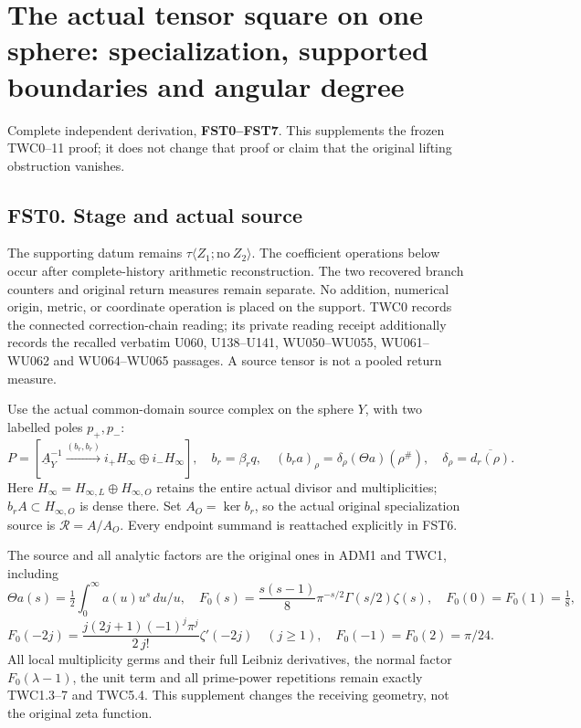 \section{The actual tensor square on one sphere: specialization,
supported boundaries and angular
degree}\label{the-actual-tensor-square-on-one-sphere-specialization-supported-boundaries-and-angular-degree}

Complete independent derivation, \textbf{FST0--FST7}. This supplements
the frozen TWC0--11 proof; it does not change that proof or claim that
the original lifting obstruction vanishes.

\subsection{FST0. Stage and actual
source}\label{fst0.-stage-and-actual-source}

The supporting datum remains
\(\tau\langle Z_1;\mathrm{no}\ Z_2\rangle\). The coefficient operations
below occur after complete-history arithmetic reconstruction. The two
recovered branch counters and original return measures remain separate.
No addition, numerical origin, metric, or coordinate operation is placed
on the support. TWC0 records the connected correction-chain reading; its
private reading receipt additionally records the recalled verbatim U060,
U138--U141, WU050--WU055, WU061--WU062 and WU064--WU065 passages. A
source tensor is not a pooled return measure.

Use the actual common-domain source complex on the sphere \(Y\), with
two labelled poles \(p_+,p_-\): \[
P=[\underline A_Y^{-1}\xrightarrow{(b_r,b_r)}i_+H_\infty\oplus i_-H_\infty],
\quad b_r=\beta_rq,
\quad(b_ra)_\rho=\delta_\rho(\Theta a)(\rho^\#),
\quad\delta_\rho=\overline{d_r(\rho)}.
\tag{FST0.1}
\] Here \(H_\infty=H_{\infty,L}\oplus H_{\infty,O}\) retains the entire
actual divisor and multiplicities; \(b_rA\subset H_{\infty,O}\) is dense
there. Set \(A_O=\ker b_r\), so the actual original specialization
source is \(\mathcal R=A/A_O\). Every endpoint summand is reattached
explicitly in FST6.

The source and all analytic factors are the original ones in ADM1 and
TWC1, including \[
\Theta a(s)=\tfrac12\int_0^\infty a(u)u^s\,du/u,
\quad F_0(s)=\frac{s(s-1)}8\pi^{-s/2}\Gamma(s/2)\zeta(s),
\quad F_0(0)=F_0(1)=\tfrac18,
\] \[
F_0(-2j)=\frac{j(2j+1)(-1)^j\pi^j}{2\,j!}\zeta'(-2j)\quad(j\ge1),
\quad F_0(-1)=F_0(2)=\pi/24.
\tag{FST0.2}
\] All local multiplicity germs and their full Leibniz derivatives, the
normal factor \(F_0(\lambda-1)\), the unit term and all prime-power
repetitions remain exactly TWC1.3--7 and TWC5.4. This supplement changes
the receiving geometry, not the original zeta function.

